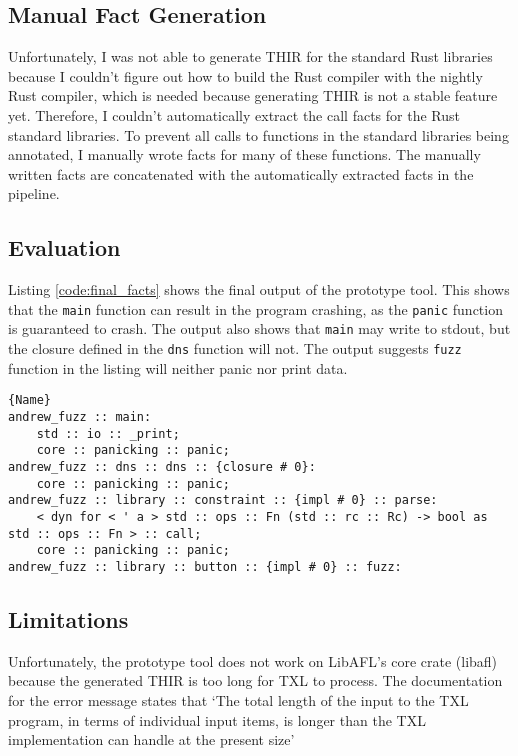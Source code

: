 \documentclass[11pt]{article}
\begin{document}
\subsection{Manual Fact Generation}

Unfortunately, I was not able to generate THIR for the standard Rust libraries because I couldn't figure out how to build the Rust compiler with the nightly Rust compiler, which is needed because generating THIR is not a stable feature yet.
Therefore, I couldn't automatically extract the call facts for the Rust standard libraries.
To prevent all calls to functions in the standard libraries being annotated, I manually wrote facts for many of these functions.
The manually written facts are concatenated with the automatically extracted facts in the pipeline.

\subsection{Evaluation}

Listing \ref{code:final_facts} shows the final output of the prototype tool.
This shows that the \lstinline{main} function can result in the program crashing, as the \lstinline{panic} function is guaranteed to crash.
The output also shows that \lstinline{main} may write to stdout, but the closure defined in the \lstinline{dns} function will not.
The output suggests \lstinline{fuzz} function in the listing will neither panic nor print data.

\begin{lstlisting}[caption=External Function Annotions, label=code:final_facts]{Name}
andrew_fuzz :: main:
	std :: io :: _print;
	core :: panicking :: panic;
andrew_fuzz :: dns :: dns :: {closure # 0}:
	core :: panicking :: panic;
andrew_fuzz :: library :: constraint :: {impl # 0} :: parse:
	< dyn for < ' a > std :: ops :: Fn (std :: rc :: Rc) -> bool as std :: ops :: Fn > :: call;
	core :: panicking :: panic;
andrew_fuzz :: library :: button :: {impl # 0} :: fuzz:
\end{lstlisting}

\subsection{Limitations}

Unfortunately, the prototype tool does not work on LibAFL's core crate (libafl) because the generated THIR is too long for TXL to process.
The documentation for the error message states that `The total length of the input to the TXL program, in terms of individual input items, is longer than the TXL implementation can handle at the present size' \cite{TXL_Error_Guide}
\end{document}
